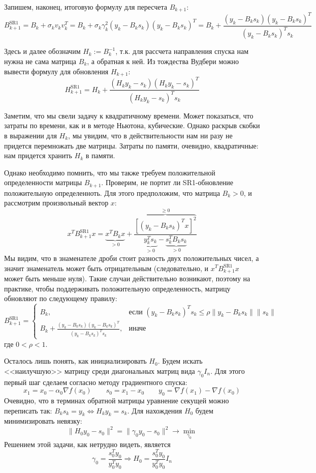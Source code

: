 \documentclass[a4paper, 12pt]{article}
\begin{document}
Запишем, наконец, итоговую формулу для пересчета $B_{k+1}$:
$$B_{k+1}^{\mathrm{SR1}} = B_k + \sigma_kv_kv_k^T = B_k + \sigma_k\gamma_k^2 (y_k - B_ks_k)(y_k - B_ks_k)^T = B_k + \frac{(y_k - B_ks_k)(y_k - B_ks_k)^T}{(y_k - B_ks_k)^Ts_k}$$

Здесь и далее обозначим $H_k := B_k^{-1}$, т.к. для рассчета направления спуска нам нужна не сама матрица $B_k$, а обратная к ней. Из тождества Вудбери можно вывести формулу для обновления $H_{k+1}$:
$$H_{k+1}^{\mathrm{SR1}} = H_k + \frac{(H_ky_k - s_k)(H_ky_k - s_k)^T}{(H_ky_k - s_k)^Ts_k}$$

Заметим, что мы свели задачу к квадратичному времени. Может показаться, что затраты по времени, как и в методе Ньютона, кубические. Однако раскрыв скобки в выражении для $H_k$, мы увидим, что в действительности нам ни разу не придется перемножать две матрицы. Затраты по памяти, очевидно, квадратичные: нам придется хранить $H_k$ в памяти.

Однако необходимо помнить, что мы также требуем положительной определенности матрицы $B_{k+1}$. Проверим, не портит ли SR1-обновление положительную определенноть. Для этого предположим, что матрица $B_k > 0$, и рассмотрим произвольный вектор $x$:
$$x^TB_{k+1}^{\mathrm{SR1}}x = \underbrace{x^TB_kx}_{>0} + \frac{\overbrace{[(y_k - B_ks_k)^Tx]^2}^{\geq 0}}{\underbrace{y_k^Ts_k}_{>0} - \underbrace{s_k^TB_ks_k}_{>0}}$$
Мы видим, что в знаменателе дроби стоит разность двух положительных чисел, а значит знаменатель может быть отрицательным (следовательно, и $x^TB_{k+1}^{\mathrm{SR1}}x$ может быть меньше нуля). Такие случаи действительно возникают, поэтому на практике, чтобы поддерживать положительную определенность, матрицу обновляют по следующему правилу:
$$
B_{k+1}^{\mathrm{SR1}} = \begin{cases}
B_k, & \text{если } (y_k - B_ks_k)^Ts_k \leq \rho \|y_k - B_ks_k\|\|s_k\| \\
B_k + \frac{(y_k - B_ks_k)(y_k - B_ks_k)^T}{(y_k - B_ks_k)^Ts_k}, & \text{иначе}
\end{cases}
$$
где $0 < \rho < 1$.

Осталось лишь понять, как инициализировать $H_0$. Будем искать <<наилучшую>> матрицу среди диагональных матриц вида $\gamma_0I_n$. Для этого первый шаг сделаем согласно методу градиентного спуска:
$$x_1 = x_0 - \alpha_0\nabla f(x_0) \qquad s_0 = x_1 - x_0 \qquad y_0 = \nabla f(x_1) - \nabla f(x_0)$$
Очевидно, что в терминах обратной матрицы уравнение секущей можно переписать так: $B_ks_k = y_k \Leftrightarrow H_ky_k = s_k$. Для нахождения $H_0$ будем минимизировать невязку:
$$\|H_0y_0 - s_0\|^2 = \|\gamma_0y_0-s_0\|^2 \to \min_{\gamma_0}$$
Решением этой задачи, как нетрудно видеть, является
$$\gamma_0 = \frac{s_0^Ty_0}{y_0^Ty_0} \Rightarrow H_0 = \frac{s_0^Ty_0}{y_0^Ty_0}I_n$$
\end{document}
